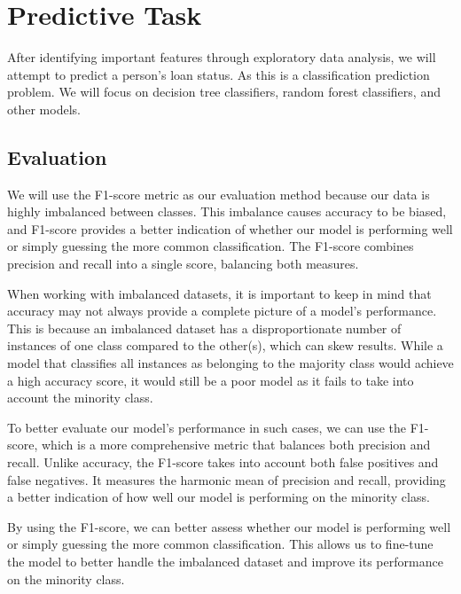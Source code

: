 \documentclass[sigplan]{acmart}
\begin{document}
\section{Predictive Task}
After  identifying important features through exploratory data analysis, we will attempt to predict a person's loan status.
As this is a classification prediction problem. We will focus on decision tree classifiers, random forest classifiers, and other models.
\subsection{Evaluation}
We will use the F1-score metric as our evaluation method because our data is highly imbalanced between classes. This imbalance causes accuracy to be biased, and F1-score provides a better indication of whether our model is performing well or simply guessing the more common classification. The F1-score combines precision and recall into a single score, balancing both measures.

When working with imbalanced datasets, it is important to keep in mind that accuracy may not always provide a complete picture of a model's performance. This is because an imbalanced dataset has a disproportionate number of instances of one class compared to the other(s), which can skew results. While a model that classifies all instances as belonging to the majority class would achieve a high accuracy score, it would still be a poor model as it fails to take into account the minority class.

To better evaluate our model's performance in such cases, we can use the F1-score, which is a more comprehensive metric that balances both precision and recall. Unlike accuracy, the F1-score takes into account both false positives and false negatives. It measures the harmonic mean of precision and recall, providing a better indication of how well our model is performing on the minority class.

By using the F1-score, we can better assess whether our model is performing well or simply guessing the more common classification. This allows us to fine-tune the model to better handle the imbalanced dataset and improve its performance on the minority class.
\end{document}
